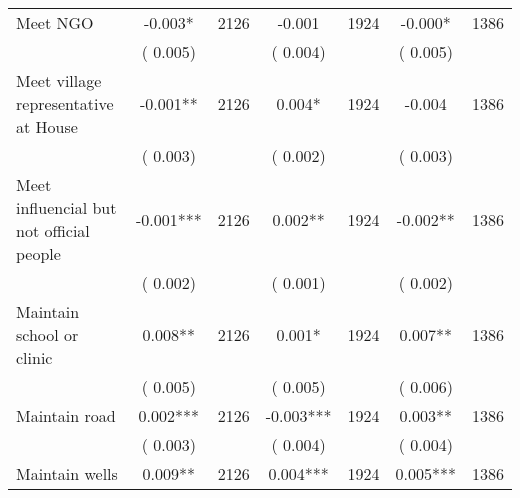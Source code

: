 \begin{tabular}{l*{6}{c}}
Meet NGO        &             -0.003*      &       2126       &             -0.001      &       1924       &             -0.000*      &       1386       \\
                       &       (       0.005)            &                               &       (       0.004)            &                               &       (       0.005)            &                               \\
Meet village representative at House        &             -0.001**      &       2126       &              0.004*      &       1924       &             -0.004      &       1386       \\
                       &       (       0.003)            &                               &       (       0.002)            &                               &       (       0.003)            &                               \\
Meet influencial but not official people        &             -0.001***      &       2126       &              0.002**      &       1924       &             -0.002**      &       1386       \\
                       &       (       0.002)            &                               &       (       0.001)            &                               &       (       0.002)            &                               \\
Maintain school or clinic        &              0.008**      &       2126       &              0.001*      &       1924       &              0.007**      &       1386       \\
                       &       (       0.005)            &                               &       (       0.005)            &                               &       (       0.006)            &                               \\
Maintain road        &              0.002***      &       2126       &             -0.003***      &       1924       &              0.003**      &       1386       \\
                       &       (       0.003)            &                               &       (       0.004)            &                               &       (       0.004)            &                               \\
Maintain wells        &              0.009**      &       2126       &              0.004***      &       1924       &              0.005***      &       1386       \\

\end{tabular}
